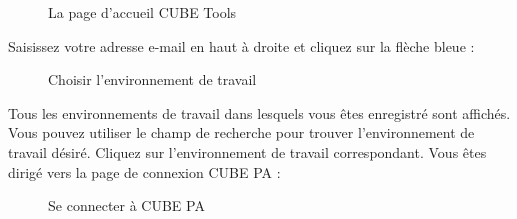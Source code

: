 \begin{figure}[H]
\caption{La page d'accueil CUBE Tools}
\end{figure}

Saisissez votre adresse e-mail en haut à droite et cliquez sur la flèche bleue :

\begin{figure}[H]
\caption{Choisir l'environnement de travail}
\end{figure}

Tous les environnements de travail dans lesquels vous êtes enregistré sont affichés. Vous pouvez utiliser le champ de recherche pour trouver l'environnement de travail désiré. Cliquez sur l'environnement de travail correspondant. Vous êtes dirigé vers la page de connexion CUBE PA :

\begin{figure}[H]
\caption{Se connecter à CUBE PA}
\end{figure}

